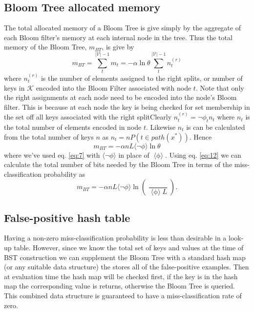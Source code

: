 \documentclass[12pt]{article}
\DeclareMathOperator*{\epsi}{ \langle \psi_{BT} \rangle}
\DeclareMathOperator*{\ephi}{ \langle \phi \rangle}
\begin{document}
\subsection*{Bloom Tree allocated memory}

The total allocated memory of a Bloom Tree is give simply by the aggregate of each Bloom filter's memory at each internal node in the tree. Thus the total memory of the Bloom Tree, $m_{BT}$, is give by
\begin{equation}
m_{BT}=  \sum_{t}^{|\mathcal{V}| -1} m_{t} = -\alpha \ln \theta \sum_{t}^{|\mathcal{V}| -1} n_t^{(r)} 
\end{equation}
where $n_t^{(r)}$ is the number of elements assigned to the right splits, or number of keys in $\mathcal{K}$ encoded into the Bloom Filter associated with node $t$. Note that only the right assignments at each node need to be encoded into the node's Bloom filter. This is because at each node the key is being checked for set membership in the set off all keys associated with the right splitClearly $n_t^{(r)} = \lnot \phi_t n_t$ where $n_t$ is the total number of elements encoded in node $t$. Likewise $n_t$ is can be calculated from the total number of keys $n$ as $n_t = n P(t \in path(x^*))$. Hence 
\begin{equation}
m_{BT} = -\alpha n L \langle \lnot \phi \rangle  \ln \theta 
\end{equation}
where we've used eq. \ref{eq:7} with $\langle \lnot \phi \rangle$ in place of $\ephi$. 
Using eq. \ref{eq:12} we can calculate the total number of bits needed by the Bloom Tree in terms of the miss-classification probability as 
\begin{equation}
m_{BT} = -\alpha n L \langle \lnot \phi \rangle  \ln \left( \frac{\epsi}{\ephi L} \right).
\end{equation} 

\subsection*{False-positive hash table}
Having a non-zero miss-classification probability is less than desirable in a look-up table. However, since we know the total set of keys and values at the time of BST construction we can supplement the Bloom Tree with a standard hash map (or any suitable data structure) the stores all of the false-positive examples. Then at evaluation time the hash map will be checked first, if the key is in the hash map the corresponding value is returns, otherwise the Bloom Tree is queried. This combined data structure is guaranteed to have a miss-classification rate of zero. 
\end{document}
